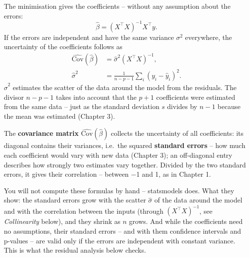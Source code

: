 \documentclass[
  letterpaper,
  DIV=11,
  numbers=noendperiod]{scrreprt}
\begin{document}
\begin{tcolorbox}[enhanced jigsaw, left=2mm, title=\textcolor{quarto-callout-important-color}{\faExclamation}\hspace{0.5em}{Least squares estimate and its uncertainty}, opacityback=0, breakable, rightrule=.15mm, arc=.35mm, toptitle=1mm, colbacktitle=quarto-callout-important-color!10!white, opacitybacktitle=0.6, coltitle=black, colframe=quarto-callout-important-color-frame, bottomrule=.15mm, leftrule=.75mm, bottomtitle=1mm, titlerule=0mm, toprule=.15mm, colback=white]

The minimisation gives the coefficients -- without any assumption about
the errors: \[\hat\beta = (X^\top X)^{-1} X^\top y.\] If the errors are
independent and have the same variance \(\sigma^2\) everywhere, the
uncertainty of the coefficients follows as
\[\begin{aligned} \widehat{\text{Cov}}(\hat\beta) &= \hat\sigma^2 (X^\top X)^{-1}, \\ \hat\sigma^2 &= \frac{1}{n - p - 1}\sum_i (y_i - \hat y_i)^2. \end{aligned}\]
\(\hat\sigma^2\) estimates the scatter of the data around the model from
the residuals. The divisor \(n - p - 1\) takes into account that the
\(p + 1\) coefficients were estimated from the same data -- just as the
standard deviation \(s\) divides by \(n - 1\) because the mean was
estimated (Chapter 3).

\end{tcolorbox}

The \textbf{covariance matrix} \(\widehat{\text{Cov}}(\hat\beta)\)
collects the uncertainty of all coefficients: its diagonal contains
their variances, i.e.~the squared \textbf{standard errors} -- how much
each coefficient would vary with new data (Chapter 3); an off-diagonal
entry describes how strongly two estimates vary together. Divided by the
two standard errors, it gives their correlation -- between −1 and 1, as
in Chapter 1.

You will not compute these formulas by hand -- statsmodels does. What
they show: the standard errors grow with the scatter \(\hat\sigma\) of
the data around the model and with the correlation between the inputs
(through \((X^\top X)^{-1}\), see \emph{Collinearity} below), and they
shrink as \(n\) grows. And while the coefficients need no assumptions,
their standard errors -- and with them confidence intervals and p-values
-- are valid only if the errors are independent with constant variance.
This is what the residual analysis below checks.
\end{document}
